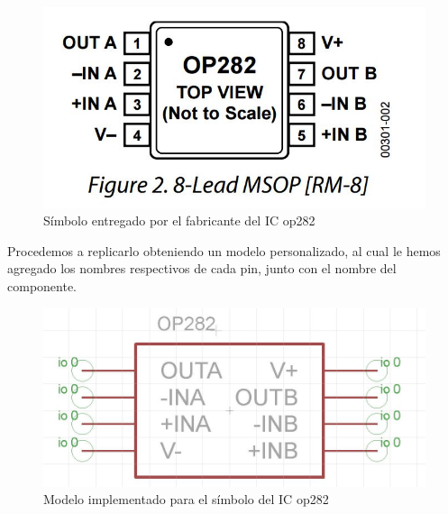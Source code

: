 \documentclass[11pt,letterpaper,spanish]{article}
\begin{document}
\begin{figure}[!h]
\begin{center}
\includegraphics[scale=0.4]{figuras/5.JPG}
\end{center}
\caption{Símbolo entregado por el fabricante del IC op282}
\end{figure}

Procedemos a replicarlo obteniendo un modelo personalizado, al cual le hemos agregado los nombres respectivos de cada pin, junto con el nombre del componente.


\begin{figure}[!h]
\begin{center}
\includegraphics[scale=0.3]{figuras/6.JPG}
\end{center}
\caption{Modelo implementado para el símbolo del IC op282}
\end{figure}
\end{document}
